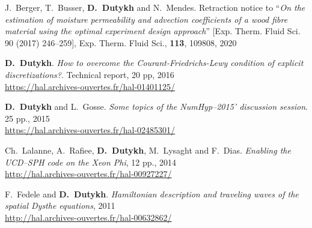 \documentclass[final, a4paper, oneside, 12pt]{article}
\numberwithin{equation}{section}
\begin{document}
\begin{etaremune}


  
  \item J.~Berger, T.~Busser, \textbf{D.~Dutykh} and N.~Mendes. Retraction notice to ``\textit{On the estimation of moisture permeability and advection coefficients of a wood fibre material using the optimal experiment design approach}'' [Exp. Therm. Fluid Sci. 90 (2017) 246--259], Exp. Therm. Fluid Sci., \textbf{113}, 109808, 2020 %



  \item \textbf{D.~Dutykh}. \textit{How to overcome the Courant-Friedrichs-Lewy condition of explicit discretizations?}. Technical report, 20 pp, 2016 \\ %
  \url{https://hal.archives-ouvertes.fr/hal-01401125/}
  


  \item \textbf{D.~Dutykh} and L.~Gosse. \textit{Some topics of the NumHyp--2015' discussion session}. 25 pp., 2015 \\ %
  \url{https://hal.archives-ouvertes.fr/hal-02485301/}
  

  
  \item Ch.~Lalanne, A.~Rafiee, \textbf{D.~Dutykh}, M.~Lysaght and F.~Dias. \textit{Enabling the UCD--SPH code on the Xeon Phi}, 12 pp., 2014 \\ %
  \url{http://hal.archives-ouvertes.fr/hal-00927227/}
  


  \item F.~Fedele and \textbf{D.~Dutykh}. \textit{Hamiltonian description and traveling waves of the spatial Dysthe equations}, 2011 \\ %
  \url{http://hal.archives-ouvertes.fr/hal-00632862/}
  

\end{etaremune}
\end{document}

